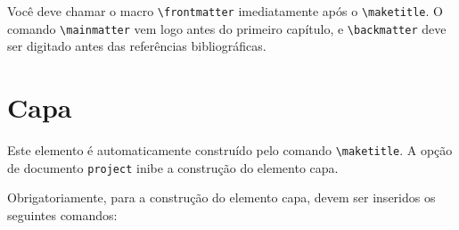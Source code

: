 \documentclass[report]{uftex}
\begin{document}
 Você deve chamar o macro \verb+\frontmatter+ imediatamente após o \verb+\maketitle+. O comando \verb+\mainmatter+ vem logo antes do primeiro capítulo, e \verb+\backmatter+ deve ser digitado antes das referências bibliográficas.
\section{Capa}
\label{sec:capa}

\noindent Este elemento é automaticamente construído pelo comando \verb+\maketitle+. A opção de documento \verb+project+ inibe a construção do elemento capa. \cite{JW82}

Obrigatoriamente, para a construção do elemento capa, devem ser inseridos os seguintes comandos:
\end{document}
